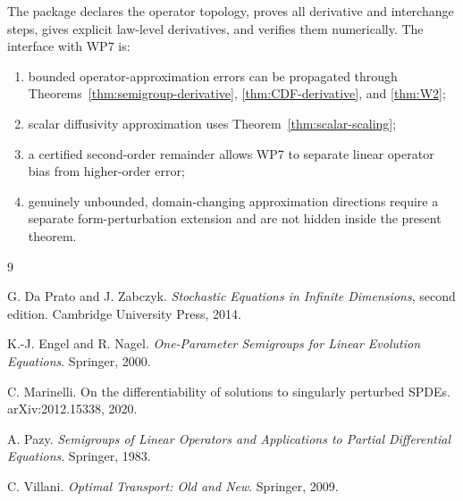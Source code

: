\documentclass[11pt]{article}
\theoremstyle{remark}
\begin{document}
The package declares the operator topology, proves all derivative and interchange steps, gives explicit law-level derivatives, and verifies them numerically. The interface with WP7 is:
\begin{enumerate}[label=(\roman*)]
\item bounded operator-approximation errors can be propagated through Theorems~\ref{thm:semigroup-derivative}, \ref{thm:CDF-derivative}, and \ref{thm:W2};
\item scalar diffusivity approximation uses Theorem~\ref{thm:scalar-scaling};
\item a certified second-order remainder allows WP7 to separate linear operator bias from higher-order error;
\item genuinely unbounded, domain-changing approximation directions require a separate form-perturbation extension and are not hidden inside the present theorem.
\end{enumerate}

\begin{thebibliography}{9}

G. Da Prato and J. Zabczyk.
\newblock \emph{Stochastic Equations in Infinite Dimensions}, second edition.
\newblock Cambridge University Press, 2014.

K.-J. Engel and R. Nagel.
\newblock \emph{One-Parameter Semigroups for Linear Evolution Equations}.
\newblock Springer, 2000.

C. Marinelli.
\newblock On the differentiability of solutions to singularly perturbed SPDEs.
\newblock arXiv:2012.15338, 2020.

A. Pazy.
\newblock \emph{Semigroups of Linear Operators and Applications to Partial Differential Equations}.
\newblock Springer, 1983.

C. Villani.
\newblock \emph{Optimal Transport: Old and New}.
\newblock Springer, 2009.

\end{thebibliography}
\end{document}
